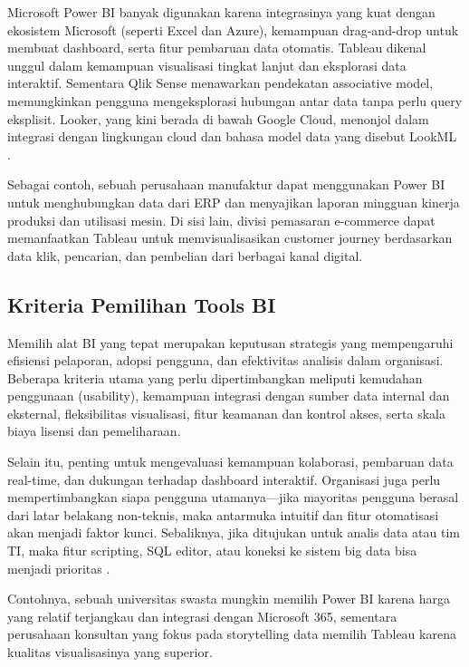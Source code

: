 Microsoft Power BI banyak digunakan karena integrasinya yang kuat dengan ekosistem Microsoft (seperti Excel dan Azure), kemampuan drag-and-drop untuk membuat dashboard, serta fitur pembaruan data otomatis. Tableau dikenal unggul dalam kemampuan visualisasi tingkat lanjut dan eksplorasi data interaktif. Sementara Qlik Sense menawarkan pendekatan associative model, memungkinkan pengguna mengeksplorasi hubungan antar data tanpa perlu query eksplisit. Looker, yang kini berada di bawah Google Cloud, menonjol dalam integrasi dengan lingkungan cloud dan bahasa model data yang disebut LookML \cite{gallo2022comparison}.

Sebagai contoh, sebuah perusahaan manufaktur dapat menggunakan Power BI untuk menghubungkan data dari ERP dan menyajikan laporan mingguan kinerja produksi dan utilisasi mesin. Di sisi lain, divisi pemasaran e-commerce dapat memanfaatkan Tableau untuk memvisualisasikan customer journey berdasarkan data klik, pencarian, dan pembelian dari berbagai kanal digital.

\subsection{Kriteria Pemilihan Tools BI}

Memilih alat BI yang tepat merupakan keputusan strategis yang mempengaruhi efisiensi pelaporan, adopsi pengguna, dan efektivitas analisis dalam organisasi. Beberapa kriteria utama yang perlu dipertimbangkan meliputi kemudahan penggunaan (usability), kemampuan integrasi dengan sumber data internal dan eksternal, fleksibilitas visualisasi, fitur keamanan dan kontrol akses, serta skala biaya lisensi dan pemeliharaan.

Selain itu, penting untuk mengevaluasi kemampuan kolaborasi, pembaruan data real-time, dan dukungan terhadap dashboard interaktif. Organisasi juga perlu mempertimbangkan siapa pengguna utamanya—jika mayoritas pengguna berasal dari latar belakang non-teknis, maka antarmuka intuitif dan fitur otomatisasi akan menjadi faktor kunci. Sebaliknya, jika ditujukan untuk analis data atau tim TI, maka fitur scripting, SQL editor, atau koneksi ke sistem big data bisa menjadi prioritas \cite{ramakrishnan2019factors}.

Contohnya, sebuah universitas swasta mungkin memilih Power BI karena harga yang relatif terjangkau dan integrasi dengan Microsoft 365, sementara perusahaan konsultan yang fokus pada storytelling data memilih Tableau karena kualitas visualisasinya yang superior.

